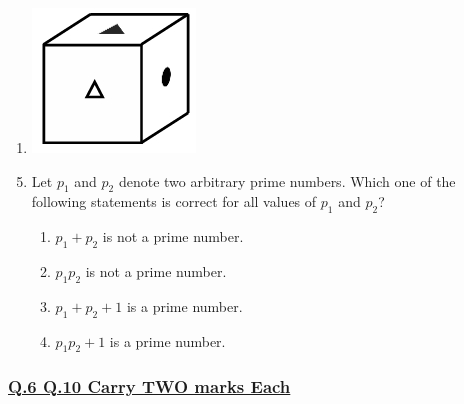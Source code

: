 \documentclass[journal]{IEEEtran}
\theoremstyle{remark}
\begin{document}
\begin{enumerate}[itemsep=1em]
\begin{multicols}{4}
\begin{enumerate}
\begin{minipage}[t]{0.2\textwidth}
        \label{fig:4}
    \end{minipage}
    \item \begin{minipage}[t]{0.2\textwidth}
    \vspace{0pt}
        \includegraphics[width=\columnwidth]{figs/fig-5.jpeg}
    \label{fig:5}
    \end{minipage}
\end{enumerate}
\end{multicols}
\end{enumerate}

\begin{enumerate}[itemsep=1em]
\setcounter{enumi}{4}
\item Let $p_1$ and $p_2$ denote two arbitrary prime numbers. Which one of the following statements is correct for all values of $p_1$ and $p_2$? 
\begin{enumerate}[leftmargin=2.5em, labelsep=0.5em, itemsep=0.5em]
    \item $p_1 + p_2$ is not a prime number. 
    \item $p_1p_2$ is not a prime number.
    \item $p_1+p_2+1$ is a prime number.
    \item $p_1p_2+1$ is a prime number.
\end{enumerate}
\end{enumerate}

\subsubsection{\underline{Q.6 \text{-} Q.10 Carry TWO marks Each}}
\setlength{\parskip}{1em}
\end{document}
